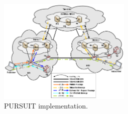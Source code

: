\documentclass[conference]{IEEEtran}
\begin{document}
\begin{figure}[h]
\centering
\includegraphics[width=2.5in]{pursuit}
\caption{PURSUIT implementation.}
\label{pursuit}
\end{figure}



%
\end{document}
